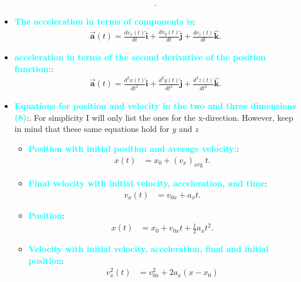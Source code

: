 \documentclass{report}
\begin{document}
\begin{itemize}
\begin{align*}
            .\end{align*}
        \item \textbf{\textcolor{cyan}{The acceleration in terms of components is}}:
            \begin{align*}
                \vec{\mathbf{a}}(t) = \frac{dv_{x}(t)}{dt}\hat{\mathbf{i}} + \frac{dv_{y}(t)}{dt}\hat{\mathbf{j}} + \frac{dv_{z}(t)}{dt}\hat{\mathbf{k}}
            .\end{align*}
        \item \textbf{\textcolor{cyan}{acceleration in terms of the second derivative of the position function:}}:
            \begin{align*}
                \vec{\mathbf{a}}(t) = \frac{d^{2}x(t)}{dt^{2}}\hat{\mathbf{i}} + \frac{d^{2}y(t)}{dt^{2}}\hat{\mathbf{j}} + \frac{d^{2}z(t)}{dt^{2}}\hat{\mathbf{k}}
            .\end{align*}
        \item \textbf{\textcolor{cyan}{Equations for position and velocity in the two and three dimensions (8)}}:. For simplicity I will only list the ones for the x-direction. However, keep in mind that these same equations hold for $y$ and $z$
            \begin{itemize}
                \item \textbf{\textcolor{cyan}{Position with initial position and average velocity:}}: 
                    \begin{align*}
                        x(t)&=x_0+\left(v_x\right)_{\text {avg }} t
                    .\end{align*}
                \item \textbf{\textcolor{cyan}{Final velocity with initial velocity, acceleration, and time}}:
                    \begin{align*}
                        v_x(t)&=v_{0 x}+a_x t
                    .\end{align*}
                \item \textbf{\textcolor{cyan}{Position}}:
                    \begin{align*}
                        x(t)&=x_0+v_{0 x} t+\frac{1}{2} a_x t^2
                    .\end{align*}
                \item \textbf{\textcolor{cyan}{Velocity with initial velocity, acceleration, final and initial position}}:
                    \begin{align*}
                        v_x^2(t)&=v_{0 x}^2+2 a_x\left(x-x_0\right) 

\end{align*}
\end{itemize}
\end{itemize}
\end{document}
